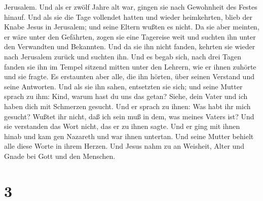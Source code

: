 Jerusalem.  Und als er zwölf Jahre alt war, gingen sie
nach Gewohnheit des Festes hinauf.  Und als sie die Tage
vollendet hatten und wieder heimkehrten, blieb der Knabe Jesus in
Jerusalem; und seine Eltern wußten es nicht.  Da sie aber
meinten, er wäre unter den Gefährten, zogen sie eine Tagereise weit und
suchten ihn unter den Verwandten und Bekannten.  Und da
sie ihn nicht fanden, kehrten sie wieder nach Jerusalem zurück und
suchten ihn.  Und es begab sich, nach drei Tagen fanden
sie ihn im Tempel sitzend mitten unter den Lehrern, wie er ihnen zuhörte
und sie fragte.  Es erstaunten aber alle, die ihn hörten,
über seinen Verstand und seine Antworten.  Und als sie
ihn sahen, entsetzten sie sich; und seine Mutter sprach zu ihm: Kind,
warum hast du uns das getan? Siehe, dein Vater und ich haben dich mit
Schmerzen gesucht.  Und er sprach zu ihnen: Was habt ihr
mich gesucht? Wußtet ihr nicht, daß ich sein muß in dem, was meines
Vaters ist?  Und sie verstanden das Wort nicht, das er zu
ihnen sagte.  Und er ging mit ihnen hinab und kam gen
Nazareth und war ihnen untertan. Und seine Mutter behielt alle diese
Worte in ihrem Herzen.  Und Jesus nahm zu an Weisheit,
Alter und Gnade bei Gott und den Menschen.

\hypertarget{section-2}{%
\section{3}\label{section-2}}

